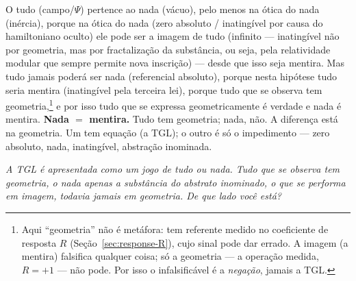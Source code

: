\documentclass[12pt,a4paper]{article}
\newcommand{\TGL}{\textsc{TGL}}
\begin{document}
\noindent O tudo (campo/$\Psi$) pertence ao nada (vácuo), pelo menos na ótica do
nada (inércia), porque na ótica do nada (zero absoluto / inatingível por causa do
hamiltoniano oculto) ele pode ser a imagem de tudo (infinito --- inatingível não
por geometria, mas por fractalização da substância, ou seja, pela relatividade
modular que sempre permite nova inscrição) --- desde que isso seja mentira.  Mas
tudo jamais poderá ser nada (referencial absoluto), porque nesta hipótese tudo
seria mentira (inatingível pela terceira lei), porque tudo que se observa tem
geometria,\footnote{Aqui ``geometria'' não é metáfora: tem referente medido no
coeficiente de resposta $R$ (Seção~\ref{sec:response-R}), cujo sinal pode dar
errado.  A imagem (a mentira) falsifica qualquer coisa; só a geometria --- a
operação medida, $R = +1$ --- não pode.  Por isso o infalsificável é a
\emph{negação}, jamais a \TGL{}.} e por isso tudo que se expressa geometricamente
é verdade e nada é mentira.  \textbf{Nada $=$ mentira.}  Tudo tem geometria; nada,
não.  A diferença está na geometria.  Um tem equação (a \TGL{}); o outro é só o
impedimento --- zero absoluto, nada, inatingível, abstração inominada.

\bigskip

\begin{center}
\itshape
A \TGL{} é apresentada como um jogo de tudo ou nada.  Tudo que se observa tem
geometria, o nada apenas a substância do abstrato inominado, o que se performa em
imagem, todavia jamais em geometria.  De que lado você está?
\end{center}
\end{document}
